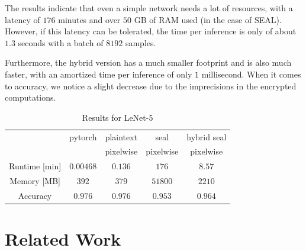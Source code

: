 \documentclass[a4paper,11pt,oneside]{report}
\begin{document}
The results indicate that even a simple network needs a lot of resources, with a latency of $176$ minutes and over $50$ GB of RAM used (in the case of SEAL).
However, if this latency can be tolerated, the time per inference is only of about $1.3$ seconds with a batch of $8192$ samples.

Furthermore, the hybrid version has a much smaller footprint and is also much faster, with an amortized time per inference of only $1$ millisecond. When it comes to accuracy, we notice a slight decrease due to the imprecisions in the encrypted computations.

\begin{table}[h!]
  \begin{center}
    \caption{Results for LeNet-5}
    \label{table:lenet_results}
    \begin{tabular}{ c c c c c }
    \hline
    & pytorch & plaintext & seal & hybrid seal \\
    & & pixelwise & pixelwise & pixelwise \\
    \hline
    Runtime [min] & $0.00468$ & $0.136$ & $176$ & $8.57$ \\
    Memory [MB] & $392$ & $379$ & $51800$ & $2210$ \\
    Accuracy & $0.976$ & $0.976$ & $0.953$ & $0.964$ \\
    \hline
    \end{tabular}
  \end{center}
\end{table}




\chapter{Related Work}

\end{document}
